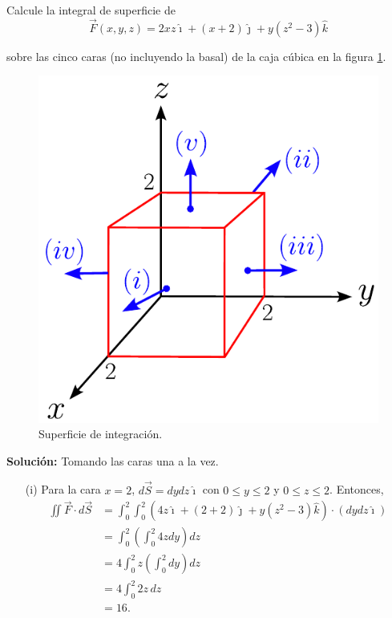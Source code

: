 \begin{ejemplo}
    Calcule la integral de superficie de 
    $$\Vec{F}(x,y,z) = 2xz \hat{\imath} + (x+2) \hat{\jmath} + y(z^2-3) \hat{k}$$

    sobre las cinco caras (no incluyendo la basal) de la caja cúbica en la figura \ref{fig:Ej_Int_Superficie}.

    \begin{figure}[H]
        \centering
        \includegraphics[scale = 0.7]{Figuras/Ej-Integral-Superficie.pdf}
        \caption{Superficie de integración.}
        \label{fig:Ej_Int_Superficie}
    \end{figure}

    \textbf{Solución:}  Tomando las caras una a la vez.

    \begin{itemize}
        \item[(i)] Para la cara $x = 2$, $d\Vec{S} = dydz \hat{\imath}$ con $0 \leq y \leq 2$ y $0 \leq z \leq 2$. Entonces,
        \begin{align*}
             \iint \Vec{F} \cdot d\Vec{S} &= \int_0^2 \int_0^2 (4z \hat{\imath} + (2+2) \hat{\jmath} + y(z^2-3) \hat{k}) \cdot (dydz \hat{\imath})  \\
             &= \int_0^2 \left( \int_0^2 4z dy\right) dz\\
             &= 4 \int_0^2 z \left( \int_0^2 dy \right) dz \\
             &= 4 \int_0^2 2z \,dz \\
             &= 16.
        \end{align*}


\end{itemize}
\end{ejemplo}
